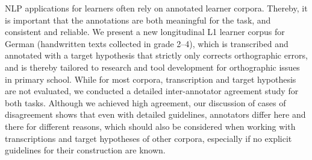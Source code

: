 NLP applications for learners often rely on annotated learner corpora. Thereby, it is important that the annotations are both meaningful for the task, and consistent and reliable. We present a new longitudinal L1 learner corpus for German (handwritten texts collected in grade 2--4), which is transcribed and annotated with a target hypothesis that strictly only corrects orthographic errors, and is thereby tailored to research and tool development for orthographic issues in primary school. While for most corpora, transcription and target hypothesis are not evaluated, we conducted a detailed inter-annotator agreement study for both tasks. Although we achieved high agreement, our discussion of cases of disagreement shows that even with detailed guidelines, annotators differ here and there for different reasons, which should also be considered when working with transcriptions and target hypotheses of other corpora, especially if no explicit guidelines for their construction are known.
